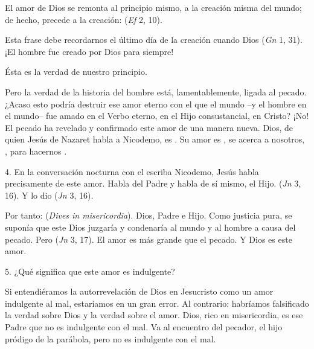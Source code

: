 \begin{body}
El amor de Dios se remonta al principio mismo, a la creación misma del mundo; de hecho, precede a la creación:  (\textit{Ef} 2, 10).

Esta frase debe recordarnos el último día de la creación cuando Dios  (\textit{Gn} 1, 31). ¡El hombre fue creado por Dios para siempre!

Ésta es la verdad de nuestro principio.

Pero la verdad de la historia del hombre está, lamentablemente, ligada al pecado. ¿Acaso esto podría destruir ese amor eterno con el que el mundo –y el hombre en el mundo– fue amado en el Verbo eterno, en el Hijo consustancial, en Cristo? ¡No! El pecado ha revelado y confirmado este amor de una manera nueva. Dios, de quien Jesús de Nazaret habla a Nicodemo, es . Su amor es , se acerca a nosotros, , para hacernos .

4. En la conversación nocturna con el escriba Nicodemo, Jesús habla precisamente de este amor. Habla del Padre y habla de sí mismo, el Hijo.  (\textit{Jn} 3, 16). Y lo dio  (\textit{Jn} 3, 16).

Por tanto:  (\textit{Dives in misericordia}). Dios, Padre e Hijo. Como justicia pura, se suponía que este Dios juzgaría y condenaría al mundo y al hombre a causa del pecado. Pero  (\textit{Jn} 3, 17). El amor es más grande que el pecado. Y Dios es este amor.

5. ¿Qué significa que este amor es indulgente?

Si entendiéramos la autorrevelación de Dios en Jesucristo como un amor indulgente al mal, estaríamos en un gran error. Al contrario: habríamos falsificado la verdad sobre Dios y la verdad sobre el amor. Dios, rico en misericordia, es ese Padre que no es indulgente con el mal. Va al encuentro del pecador, el hijo pródigo de la parábola, pero no es indulgente con el mal.


\end{body}
